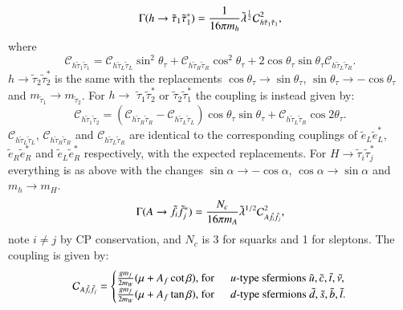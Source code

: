 \documentclass[final,3p,times,pdflatex]{elsarticle}
\begin{document}
\begin{equation}\label{hstau1stau1}
\Gamma(h \rightarrow \tilde{\tau}_1 {\tilde{\tau}}_1^*) = {1 \over 16 \pi m_h} \tilde{\lambda}^{1 \over 2} \mathcal{C}_{h \tilde{\tau}_{1} \tilde{\tau}_{1}}^2,
\end{equation} 
where
\begin{equation}
\mathcal{C}_{h \tilde{\tau}_{1} \tilde{\tau}_{1}} = \mathcal{C}_{h \tilde{\tau}_{L} \tilde{\tau}_{L}} \sin^2 \theta_\tau + \mathcal{C}_{h \tilde{\tau}_{R} \tilde{\tau}_{R}} \cos^2 \theta_\tau + 2 \cos\theta_\tau \sin\theta_\tau \mathcal{C}_{h \tilde{\tau}_{L} \tilde{\tau}_{R}}.
\end{equation}
$h \rightarrow \tilde{\tau}_2 {\tilde{\tau}}_2^*$ is the same with the replacements $\cos\theta_\tau \rightarrow \sin\theta_\tau$, $\sin\theta_\tau \rightarrow -\cos\theta_\tau$ and $m_{\tilde{\tau}_1} \rightarrow m_{\tilde{\tau}_2}$.
For $h \rightarrow$ $\tilde{\tau}_1 {\tilde{\tau}}_2^*$ or $\tilde{\tau}_2 {\tilde{\tau}}_1^*$ the coupling is instead given by:
\begin{equation}
\mathcal{C}_{h \tilde{\tau}_{1} \tilde{\tau}_{2}} = (\mathcal{C}_{h \tilde{\tau}_{R} \tilde{\tau}_{R}} - \mathcal{C}_{h \tilde{\tau}_{L} \tilde{\tau}_{L}})\cos\theta_\tau \sin\theta_\tau + \mathcal{C}_{h \tilde{\tau}_{L} \tilde{\tau}_{R}} \cos 2\theta_\tau.
\end{equation}
$\mathcal{C}_{h \tilde{\tau}_{L} \tilde{\tau}_{L}}$, $\mathcal{C}_{h \tilde{\tau}_{R} \tilde{\tau}_{R}}$ and $\mathcal{C}_{h \tilde{\tau}_{L} \tilde{\tau}_{R}}$ are identical to the corresponding couplings of $\tilde{e}_L {\tilde{e}}_L^*$, $\tilde{e}_R {\tilde{e}}_R^*$ and $\tilde{e}_L {\tilde{e}}_R^*$ respectively, with the expected replacements.
For $H \rightarrow \tilde{\tau}_i {\tilde{\tau}}_j^*$ everything is as above with the changes $\sin\alpha \rightarrow -\cos\alpha$, $\cos\alpha \rightarrow \sin\alpha$ and $m_h \rightarrow m_H$.
\begin{equation} \label{Afifj}
\Gamma(A \rightarrow \tilde{f}_i {\tilde{f}}_j^*) = {N_c \over 16 \pi m_A} \tilde{\lambda}^{1/2} \mathcal{C}_{A \tilde{f}_{i} \tilde{f}_{j}}^2,
\end{equation}
note $i\neq j$ by CP conservation, and $N_c$ is 3 for squarks and 1 for
sleptons. The coupling is given by:
\begin{equation}
\mathcal{C}_{A \tilde{f}_{i} \tilde{f}_{j}} = \begin{cases}
			{g m_f \over 2 m_W}(\mu + A_f \cot \beta), $  for$ \: \: & u$-type sfermions $\tilde{u}, \tilde{c}, \tilde{t}, \tilde{\nu,} \\
			{g m_f \over 2 m_W}(\mu + A_f \tan \beta), $  for$ \: \: & d$-type sfermions $\tilde{d}, \tilde{s}, \tilde{b}, \tilde{l}. \\
			\end{cases}
\end{equation}
\end{document}
